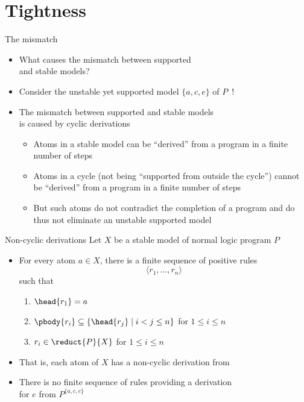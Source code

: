 \section{Tightness}
\begin{frame}{The mismatch}
  \begin{itemize}
  \item<1-> 
    What causes the mismatch between supported\\ and stable models?
      \smallskip
  \item<2-> 
    Consider the unstable yet supported model $\{a,c,e\}$ of $P$~!
    \medskip
  \item<3-> 
    The mismatch between supported and stable models\\ is caused by cyclic derivations
    \begin{itemize}
    \item<4-> Atoms in a stable model can be ``derived'' from a program in a finite number of steps
      \smallskip
    \item<5-> Atoms in a cycle (not being ``supported from outside the cycle'') cannot be ``derived''
      from a program in a finite number of steps
      \smallskip
    \item<6-> []
      But such atoms do not contradict the completion of a program and
      do thus not eliminate an unstable supported model
    \end{itemize}
  \end{itemize}
\end{frame}
\begin{frame}{Non-cyclic derivations}
  \medskip
  Let $X$ be a stable model of normal logic program $P$
  \medskip
  \begin{itemize}
  \item For every atom $a\in X$,
    there is a finite sequence of positive rules
    \[
    \langle r_1,\dots,r_n\rangle
    \]
    such that
    \begin{enumerate}\normalsize
    \item $\head{r_1}=a$
    \item $\pbody{r_i}\subseteq\{\head{r_j} \mid i<j\leq n\}$      \hfill for $1\leq i\leq n\qquad$
    \item $r_i\in\reduct{P}{X}$                                 \hfill for $1\leq i\leq n\qquad$
    \end{enumerate}
    \smallskip
  \item <2-> That is,
    each atom of $X$ has a non-cyclic derivation from 
    \medskip
  \item<3-> 
    There is no finite sequence of rules providing a derivation\\ for $e$ from $P^{\{a,c,e\}}$
  \end{itemize}
\end{frame}
